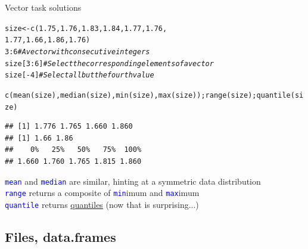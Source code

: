 \documentclass[xcolor=table,           xcolor=dvipsnames]{beamer}\usepackage[]{graphicx}\usepackage[]{color}
\makeatletter
\newcommand{\hlnum}[1]{\textcolor[rgb]{0,0,0}{#1}}
\newcommand{\hlcom}[1]{\textcolor[rgb]{0,0.392,0}{\textit{#1}}}
\newcommand{\hlopt}[1]{\textcolor[rgb]{0,0,0}{#1}}
\newcommand{\hlstd}[1]{\textcolor[rgb]{0,0,0}{#1}}
\newcommand{\hlkwb}[1]{\textcolor[rgb]{0,0,0}{#1}}
\newcommand{\hlkwd}[1]{\textcolor[rgb]{0,0,1}{#1}}
\newenvironment{kframe}{%
 \def\at@end@of@kframe{}%
 \ifinner\ifhmode%
  \def\at@end@of@kframe{\end{minipage}}%
  \begin{minipage}{\columnwidth}%
 \fi\fi%
 \def\FrameCommand##1{\hskip\@totalleftmargin \hskip-\fboxsep
 \colorbox{shadecolor}{##1}\hskip-\fboxsep
     \hskip-\linewidth \hskip-\@totalleftmargin \hskip\columnwidth}%
 \MakeFramed {\advance\hsize-\width
   \@totalleftmargin\z@ \linewidth\hsize
   \@setminipage}}%
 {\par\unskip\endMakeFramed%
 \at@end@of@kframe}
\newenvironment{knitrout}{}{} %
\newcommand{\rcode}[1]{\texttt{\textcolor{Blue}{#1}}} %
\makeatother
\begin{document}
\begin{frame}[fragile]{Vector task solutions}
\begin{knitrout}
\color{fgcolor}\begin{kframe}
\begin{alltt}
\hlstd{size} \hlkwb{<-} \hlkwd{c}\hlstd{(}\hlnum{1.75}\hlstd{,} \hlnum{1.76}\hlstd{,} \hlnum{1.83}\hlstd{,} \hlnum{1.84}\hlstd{,} \hlnum{1.77}\hlstd{,} \hlnum{1.76}\hlstd{,}
          \hlnum{1.77}\hlstd{,} \hlnum{1.66}\hlstd{,} \hlnum{1.86}\hlstd{,} \hlnum{1.76}\hlstd{)}
\hlnum{3}\hlopt{:}\hlnum{6} \hlcom{# A vector with consecutive integers}
\hlstd{size[}\hlnum{3}\hlopt{:}\hlnum{6}\hlstd{]} \hlcom{# Select the corresponding elements of a vector}
\hlstd{size[}\hlopt{-}\hlnum{4}\hlstd{]} \hlcom{# Select all but the fourth value}
\end{alltt}
\end{kframe}
\end{knitrout}
\begin{knitrout}\scriptsize
{}\color{fgcolor}\begin{kframe}
\begin{alltt}
\hlkwd{c}\hlstd{(}\hlkwd{mean}\hlstd{(size),} \hlkwd{median}\hlstd{(size),} \hlkwd{min}\hlstd{(size),} \hlkwd{max}\hlstd{(size));} \hlkwd{range}\hlstd{(size);} \hlkwd{quantile}\hlstd{(size)}
\end{alltt}
\begin{verbatim}
## [1] 1.776 1.765 1.660 1.860
## [1] 1.66 1.86
##    0%   25%   50%   75%  100% 
## 1.660 1.760 1.765 1.815 1.860
\end{verbatim}
\end{kframe}
\end{knitrout}

\rcode{mean} and \rcode{median} are similar, hinting at a symmetric data distribution\\
\rcode{range} returns a composite of \rcode{min}imum and \rcode{max}imum\\
\rcode{quantile} returns \href{http://lmgtfy.com/?q=quantile}{quantiles} (now that is surprising...)
\end{frame}

\subsection{Files, data.frames}
\end{document}
